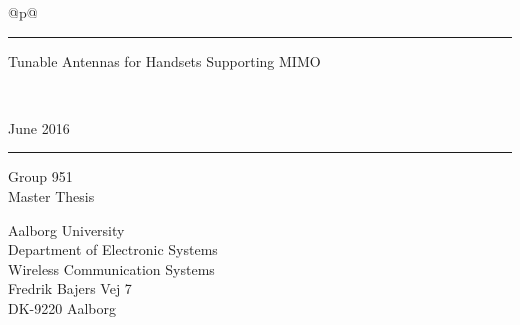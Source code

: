 \thispagestyle{empty}
\noindent%
\begin{tabular}{@{}p{\textwidth}@{}}
    \rule{\linewidth}{2mm}\vspace{1.5cm}
    \vspace*{-15mm}
    \begin{flushleft}
        \linespread{0.7}
        \fontsize{40}{56}
        \selectfont
        Tunable Antennas for Handsets Supporting MIMO
    \end{flushleft} \\[5mm] 
    \raggedright{
        \fontsize{24}{36}\selectfont
        June 2016\\ \vspace*{1mm}
    }
    \rule{\linewidth}{.7mm}
\end{tabular}
\vspace{1cm} %
\begin{flushleft}
  {\LARGE{}\selectfont
      Group 951%
  }\\
  \vspace{0.2cm}
  {\large{}\selectfont
      Master Thesis %
  }
\end{flushleft}
\begin{center}
\end{center}
\vfill
\begin{flushleft}\selectfont
  Aalborg University\\
  Department of Electronic Systems\\
  Wireless Communication Systems\\
  Fredrik Bajers Vej 7\\
  DK-9220 Aalborg
\end{flushleft}
\restoregeometry
